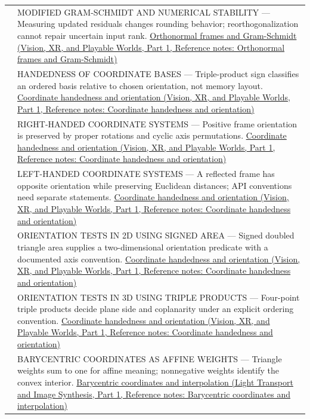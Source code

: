 {\begin{longtable}[]{@{}
  >{\raggedright\arraybackslash}p{}
  >{\raggedright\arraybackslash}p{}@{}}
562 & MODIFIED GRAM-SCHMIDT AND NUMERICAL STABILITY --- Measuring updated residuals changes rounding behavior; reorthogonalization cannot repair uncertain input rank. \href{../07-Vision-XR-and-Playable-Worlds-P01/main.pdf\#nameddest=appendix-c39f1ed34271}{Orthonormal frames and Gram-Schmidt (Vision, XR, and Playable Worlds, Part 1, Reference notes: Orthonormal frames and Gram-Schmidt)} \\
563 & HANDEDNESS OF COORDINATE BASES --- Triple-product sign classifies an ordered basis relative to chosen orientation, not memory layout. \href{../07-Vision-XR-and-Playable-Worlds-P01/main.pdf\#nameddest=appendix-87d7626c8d37}{Coordinate handedness and orientation (Vision, XR, and Playable Worlds, Part 1, Reference notes: Coordinate handedness and orientation)} \\
564 & RIGHT-HANDED COORDINATE SYSTEMS --- Positive frame orientation is preserved by proper rotations and cyclic axis permutations. \href{../07-Vision-XR-and-Playable-Worlds-P01/main.pdf\#nameddest=appendix-87d7626c8d37}{Coordinate handedness and orientation (Vision, XR, and Playable Worlds, Part 1, Reference notes: Coordinate handedness and orientation)} \\
565 & LEFT-HANDED COORDINATE SYSTEMS --- A reflected frame has opposite orientation while preserving Euclidean distances; API conventions need separate statements. \href{../07-Vision-XR-and-Playable-Worlds-P01/main.pdf\#nameddest=appendix-87d7626c8d37}{Coordinate handedness and orientation (Vision, XR, and Playable Worlds, Part 1, Reference notes: Coordinate handedness and orientation)} \\
566 & ORIENTATION TESTS IN 2D USING SIGNED AREA --- Signed doubled triangle area supplies a two-dimensional orientation predicate with a documented axis convention. \href{../07-Vision-XR-and-Playable-Worlds-P01/main.pdf\#nameddest=appendix-87d7626c8d37}{Coordinate handedness and orientation (Vision, XR, and Playable Worlds, Part 1, Reference notes: Coordinate handedness and orientation)} \\
567 & ORIENTATION TESTS IN 3D USING TRIPLE PRODUCTS --- Four-point triple products decide plane side and coplanarity under an explicit ordering convention. \href{../07-Vision-XR-and-Playable-Worlds-P01/main.pdf\#nameddest=appendix-87d7626c8d37}{Coordinate handedness and orientation (Vision, XR, and Playable Worlds, Part 1, Reference notes: Coordinate handedness and orientation)} \\
568 & BARYCENTRIC COORDINATES AS AFFINE WEIGHTS --- Triangle weights sum to one for affine meaning; nonnegative weights identify the convex interior. \href{../04-Light-Transport-and-Image-Synthesis-P01/main.pdf\#nameddest=appendix-02b9d9a81dca}{Barycentric coordinates and interpolation (Light Transport and Image Synthesis, Part 1, Reference notes: Barycentric coordinates and interpolation)} \\

\end{longtable}}
